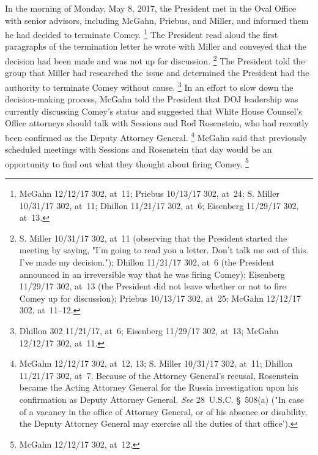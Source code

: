 {In the morning of Monday, May 8, 2017, the President met in the Oval Office with senior advisors, including McGahn, Priebus, and Miller, and informed them he had decided to terminate Comey.%
\footnote{McGahn 12/12/17 302, at~11;
Priebus 10/13/17 302, at~24;
S. Miller 10/31/17 302, at~11;
Dhillon 11/21/17 302, at~6;
Eisenberg 11/29/17 302, at~13.}
The President read aloud the first paragraphs of the termination letter he wrote with Miller and conveyed that the decision had been made and was not up for discussion.%
\footnote{S. Miller 10/31/17 302, at~11 (observing that the President started the meeting by saying, "I'm going to read you a letter.
Don't talk me out of this.
I've made my decision.");
Dhillon 11/21/17 302, at~6 (the President announced in an irreversible way that he was firing Comey);
Eisenberg 11/29/17 302, at~13 (the President did not leave whether or not to fire Comey up for discussion);
Priebus 10/13/17 302, at~25;
McGahn 12/12/17 302, at~11--12.}
The President told the group that Miller had researched the issue and determined the President had the authority to terminate Comey without cause.%
\footnote{Dhillon 302 11/21/17, at~6;
Eisenberg 11/29/17 302, at~13;
McGahn 12/12/17 302, at~11.}
In an effort to slow down the decision-making process, McGahn told the President that DOJ leadership was currently discussing Comey's status and suggested that White House Counsel's Office attorneys should talk with Sessions and Rod Rosenstein, who had recently been confirmed as the Deputy Attorney General.%
\footnote{McGahn 12/12/17 302, at~12, 13;
S. Miller 10/31/17 302, at~11;
Dhillon 11/21/17 302, at~7.
Because of the Attorney General's recusal, Rosenstein became the Acting Attorney General for the Russia investigation upon his confirmation as Deputy Attorney General.
\textit{See} 28~U.S.C. \S~508(a) ("In case of a vacancy in the office of Attorney General, or of his absence or disability, the Deputy Attorney General may exercise all the duties of that office').}
McGahn said that previously scheduled meetings with Sessions and Rosenstein that day would be an opportunity to find out what they thought about firing Comey.%
\footnote{McGahn 12/12/17 302, at~12.}

}
